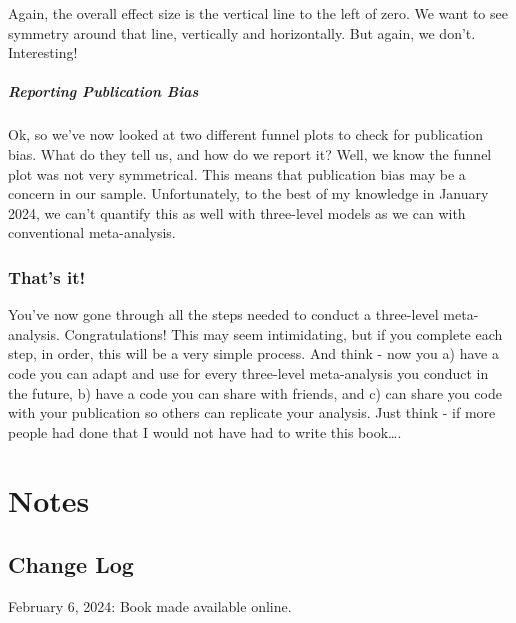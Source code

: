\documentclass[
]{book}
\begin{document}
Again, the overall effect size is the vertical line to the left of zero. We want to see symmetry around that line, vertically and horizontally. But again, we don't. Interesting!

\hypertarget{reporting-publication-bias-1}{%
\subsubsection{Reporting Publication Bias}\label{reporting-publication-bias-1}}

Ok, so we've now looked at two different funnel plots to check for publication bias. What do they tell us, and how do we report it? Well, we know the funnel plot was not very symmetrical. This means that publication bias may be a concern in our sample. Unfortunately, to the best of my knowledge in January 2024, we can't quantify this as well with three-level models as we can with conventional meta-analysis.

\hypertarget{thats-it-1}{%
\section{That's it!}\label{thats-it-1}}

You've now gone through all the steps needed to conduct a three-level meta-analysis. Congratulations! This may seem intimidating, but if you complete each step, in order, this will be a very simple process. And think - now you a) have a code you can adapt and use for every three-level meta-analysis you conduct in the future, b) have a code you can share with friends, and c) can share you code with your publication so others can replicate your analysis. Just think - if more people had done that I would not have had to write this book\ldots.

\hypertarget{section-1}{%
\subsubsection{}\label{section-1}}

\hypertarget{part-notes}{%
\part{Notes}\label{part-notes}}

\hypertarget{change-log}{%
\chapter*{Change Log}\label{change-log}}

February 6, 2024: Book made available online.

  
\end{document}
